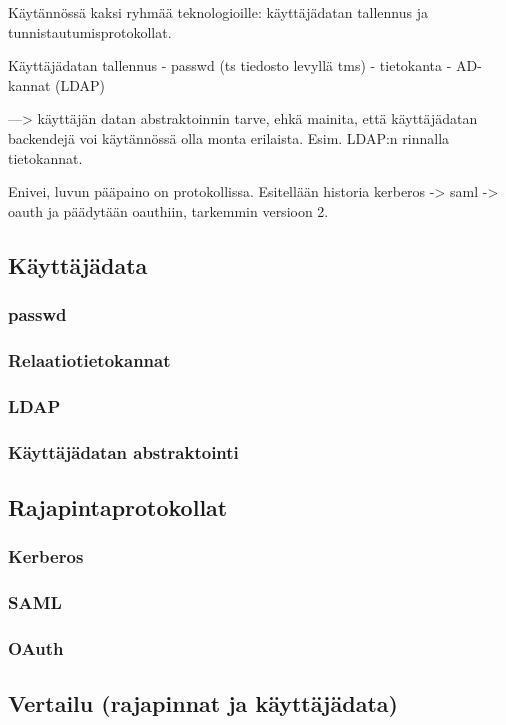Käytännössä kaksi ryhmää teknologioille: käyttäjädatan tallennus ja tunnistautumisprotokollat.

Käyttäjädatan tallennus
- passwd (ts tiedosto levyllä tms)
- tietokanta
- AD-kannat (LDAP)

---> käyttäjän datan abstraktoinnin tarve, ehkä mainita, että käyttäjädatan backendejä voi käytännössä olla monta erilaista. Esim. LDAP:n rinnalla tietokannat.

Enivei, luvun pääpaino on protokollissa. Esitellään historia kerberos -> saml -> oauth ja päädytään oauthiin, tarkemmin versioon 2.


\subsection{Käyttäjädata}

\subsubsection{passwd}

\subsubsection{Relaatiotietokannat}

\subsubsection{LDAP}

\subsubsection{Käyttäjädatan abstraktointi}

\subsection{Rajapintaprotokollat}

\subsubsection{Kerberos}

\subsubsection{SAML}

\subsubsection{OAuth}

\subsection{Vertailu (rajapinnat ja käyttäjädata)}
